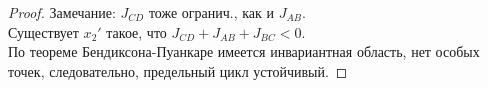 \begin{proof}
 		Замечание: \(J_{CD}\) тоже огранич., как и \(J_{AB}\).\\
 		Существует \(x_2'\) такое, что \(J_{CD} + J_{AB} + J_{BC}<0\).\\
 		По теореме Бендиксона-Пуанкаре имеется инвариантная область, нет особых точек, следовательно, предельный цикл устойчивый.
 	\end{proof}
